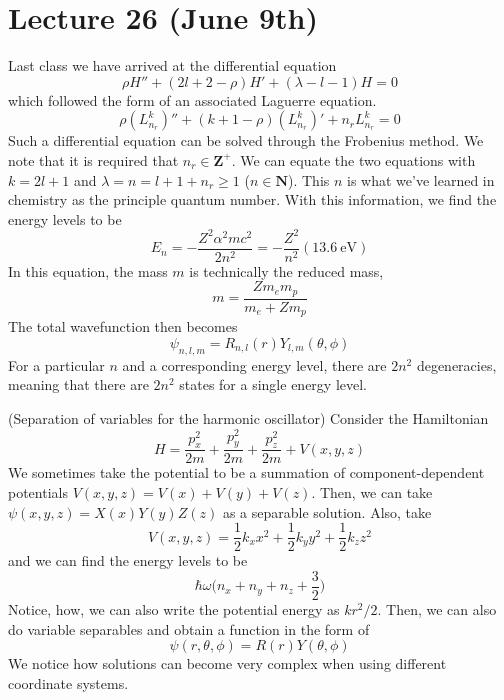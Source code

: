 \section{Lecture 26 (June 9th)}
\begin{rmk}
Last class we have arrived at the differential equation
\[\rho H''+(2l+2-\rho )H'+(\lambda -l-1)H=0\]
which followed the form of an associated Laguerre equation.
\[\rho (L^{k}_{n_{r}})''+(k+1-\rho )(L^{k}_{n_{r}})'+n_{r}L_{n_{r}}^{k}=0\]
Such a differential equation can be solved through the Frobenius method. We note that it is required that $n_{r}\in {\bm Z}^{+}$. We can equate the two equations with $k=2l+1$ and $\lambda =n=l+1+n_{r}\geq 1$ ($n\in {\bm N}$). This $n$ is what we've learned in chemistry as the principle quantum number. With this information, we find the energy levels to be
\[E_{n}=-\dfrac{Z^2\alpha ^2mc^2}{2n^2}=-\dfrac{Z^2}{n^2}(13.6\mathrm{\ eV})\]
In this equation, the mass $m$ is technically the reduced mass,
\[m=\dfrac{Zm_{e}m_{p}}{m_{e}+Zm_{p}}\]
The total wavefunction then becomes
\[\psi _{n,l,m}=R_{n,l}(r)Y_{l,m}(\theta ,\phi )\]
For a particular $n$ and a corresponding energy level, there are $2n^2$ degeneracies, meaning that there are $2n^{2}$ states for a single energy level.
\end{rmk}
\vspace{2ex}
\begin{thm}
(Separation of variables for the harmonic oscillator) Consider the Hamiltonian
\[H=\dfrac{p_{x}^2}{2m}+\dfrac{p_{y}^2}{2m}+\dfrac{p_{z}^2}{2m}+V(x,y,z)\]
We sometimes take the potential to be a summation of component-dependent potentials $V(x,y,z)=V(x)+V(y)+V(z)$. Then, we can take $\psi (x,y,z)=X(x)Y(y)Z(z)$ as a separable solution. Also, take
\[V(x,y,z)=\dfrac{1}{2}k_{x}x^2+\dfrac{1}{2}k_{y}y^2+\dfrac{1}{2}k_{z}z^2\]
and we can find the energy levels to be
\[\hbar \omega \Big(n_{x}+n_{y}+n_{z}+\dfrac{3}{2}\Big)\]
Notice, how, we can also write the potential energy as $kr^2/2$. Then, we can also do variable separables and obtain a function in the form of
\[\psi (r,\theta ,\phi )=R(r)Y(\theta ,\phi )\]
We notice how solutions can become very complex when using different coordinate systems.
\end{thm}
\vspace{2ex}
